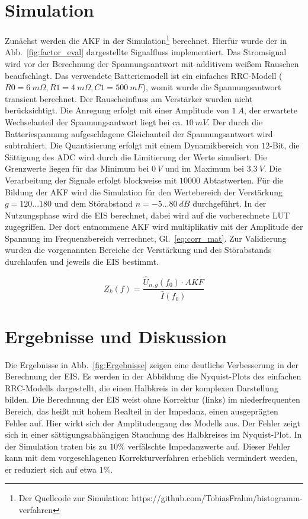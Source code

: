 \smallskip
\section{Simulation}
Zunächst werden die AKF in der Simulation\footnote[2]{Der Quellcode zur Simulation: https://github.com/TobiasFrahm/histogramm-verfahren} berechnet. Hierfür wurde der in Abb.~\ref{fig:factor_eval} dargestellte Signalfluss implementiert. Das Stromsignal wird vor der Berechnung der Spannungsantwort mit additivem weißem Rauschen beaufschlagt. Das verwendete Batteriemodell ist ein einfaches RRC-Modell ($R0 = \SI{6}{m\Omega}, R1=\SI{4}{m\Omega}, C1=\SI{500}{mF}$), womit wurde die Spannungsantwort transient berechnet. Der Rauscheinfluss am Verstärker wurden nicht berücksichtigt. Die Anregung erfolgt mit einer Amplitude von $\SI{1}{A}$, der erwartete Wechselanteil der Spannungsantwort liegt bei ca. $\SI{10}{mV}$. Der durch die Batteriespannung aufgeschlagene Gleichanteil der Spannungsantwort wird subtrahiert. Die Quantisierung erfolgt mit einem Dynamikbereich von $12$-Bit, die Sättigung des ADC wird durch die Limitierung der Werte simuliert. Die Grenzwerte liegen für das Minimum bei $\SI{0}{V}$ und im Maximum bei $\SI{3.3}{V}$. Die Verarbeitung der Signale erfolgt blockweise mit $10000$ Abtastwerten. Für die Bildung der AKF wird die Simulation für den Wertebereich der Verstärkung $g = 120 ... 180$ und dem Störabstand $n = -5 ... \SI{80}{dB}$ durchgeführt. In der Nutzungsphase wird die EIS berechnet, dabei wird auf die vorberechnete LUT zugegriffen. Der dort entnommene AKF wird multiplikativ mit der Amplitude der Spannung im Frequenzbereich verrechnet, Gl.~\eqref{eq:corr_mat}. Zur Validierung wurden die vorgenannten Bereiche der Verstärkung und des Störabstands durchlaufen und jeweils die EIS bestimmt.

\begin{equation}
	\label{eq:corr_mat}
	Z_k(f) = \frac{\hat{U}_{n,g}(f_0) \cdot AKF}{\hat{I}(f_0)}
\end{equation}	


\section{Ergebnisse und Diskussion}
Die Ergebnisse in Abb.~\ref{fig:Ergebnisse} zeigen eine deutliche Verbesserung in der Berechnung der EIS. Es werden in der Abbildung die Nyquist-Plots des einfachen RRC-Modells dargestellt, die einen Halbkreis in der komplexen Darstellung bilden. 
Die Berechnung der EIS weist ohne Korrektur (links) im niederfrequenten Bereich, das heißt mit hohem Realteil in der Impedanz, einen ausgeprägten Fehler auf. Hier wirkt sich der Amplitudengang des Modells aus. Der Fehler zeigt sich in einer sättigungsabhängigen Stauchung des Halbkreises im Nyquist-Plot. In der Simulation traten bis zu $10\%$ verfälschte Impedanzwerte auf. Dieser Fehler kann mit dem vorgeschlagenen Korrekturverfahren erheblich vermindert werden, er reduziert sich auf etwa $1\%$. 

